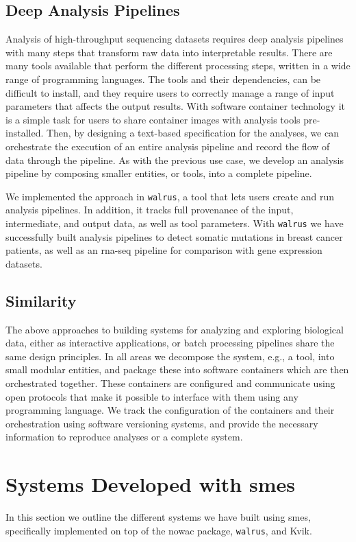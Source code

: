 \subsection{Deep Analysis Pipelines} 
Analysis of high-throughput sequencing datasets requires deep analysis pipelines
with many steps that transform raw data into interpretable
results.\cite{diao2015building} There are many tools available that
perform the different processing steps, written in a wide range of programming
languages. The tools and their dependencies, can be difficult to install, and
they require users to correctly manage a range of input parameters that affects
the output results. With software container technology it is a simple task for
users to share container images with analysis tools pre-installed. Then, by
designing a text-based specification for the analyses, we can orchestrate the
execution of an entire analysis pipeline and record the flow of data through the
pipeline. As with the previous use case, we develop an analysis pipeline by
composing smaller entities, or tools, into a complete pipeline. 

We implemented the approach in \texttt{walrus}, a tool that lets users create
and run analysis pipelines. In addition, it tracks full provenance of the input,
intermediate, and output data, as well as tool parameters. With \texttt{walrus}
we have successfully built analysis pipelines to detect somatic mutations in
breast cancer patients, as well as an \gls{rna}-seq pipeline for comparison with
gene expression datasets. 

\subsection{Similarity} 
The above approaches to building systems for analyzing and exploring biological
data, either as interactive applications, or batch processing pipelines share
the same design principles. In all areas we decompose the system, e.g., a tool,
into small modular entities, and package these into software containers which
are then orchestrated together. These containers are configured and communicate
using open protocols that make it possible to interface with them using any
programming language. We track the configuration of the containers and their
orchestration using software versioning systems, and provide the necessary
information to reproduce analyses or a complete system. 

\section{Systems Developed with \glspl{sme}}
In this section we outline the different systems we have built using \glspl{sme},
specifically implemented on top of the \gls{nowac} package, \texttt{walrus}, and
Kvik. 

